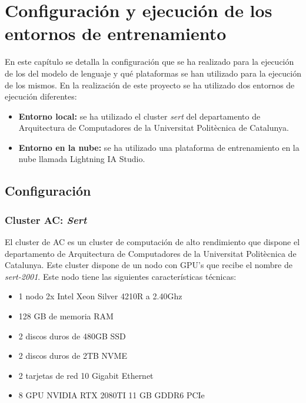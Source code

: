 \chapter{Configuración y ejecución de los entornos de entrenamiento}
\label{cap:configuracion_ejecucion}


En este capítulo se detalla la configuración que se ha realizado para la ejecución de los
del modelo de lenguaje y qué plataformas se han utilizado para la ejecución de los mismos.
En la realización de este proyecto se ha utilizado dos entornos de ejecución diferentes:

\begin{itemize}
    \item \textbf{Entorno local:} se ha utilizado el cluster \textit{sert} del departamento
        de Arquitectura de Computadores de la Universitat Politècnica de Catalunya.
    \item \textbf{Entorno en la nube:} se ha utilizado una plataforma de entrenamiento en la nube
        llamada Lightning IA Studio.
\end{itemize}

\section{Configuración}

\subsection{Cluster AC: \textit{Sert}}
\label{subsec:cluster_ac}

El cluster de AC es un cluster de computación de alto rendimiento que dispone el departamento
de Arquitectura de Computadores de la Universitat Politècnica de Catalunya. Este cluster dispone
de un nodo con GPU's que recibe el nombre de \textit{sert-2001}. Este nodo tiene las siguientes
características técnicas:

\begin{itemize}
    \item 1 nodo 2x Intel Xeon Silver 4210R a 2.40Ghz
    \item 128 GB de memoria RAM
    \item 2 discos duros de 480GB SSD
    \item 2 discos duros de 2TB NVME
    \item 2 tarjetas de red 10 Gigabit Ethernet
    \item 8 GPU NVIDIA RTX 2080TI 11 GB GDDR6 PCIe
\end{itemize}

